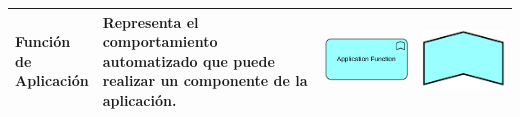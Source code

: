 {\begin{longtable}{|p{0.15\linewidth}|p{0.45\linewidth}|p{0.2\linewidth} p{0.2\linewidth}|}
    	Función de Aplicación 
    	&
    	Representa el comportamiento automatizado que puede realizar un componente de la aplicación. 
    	&
    	\begin{center}
    		\includegraphics[width=1\linewidth]{imgs/Aplication_function.pdf}
    	\end{center} &
    	\begin{center}
    		\includegraphics[width=0.7\linewidth]{imgs/function.pdf}
    	\end{center}
    	\\ \hline
    	

\end{longtable}}
